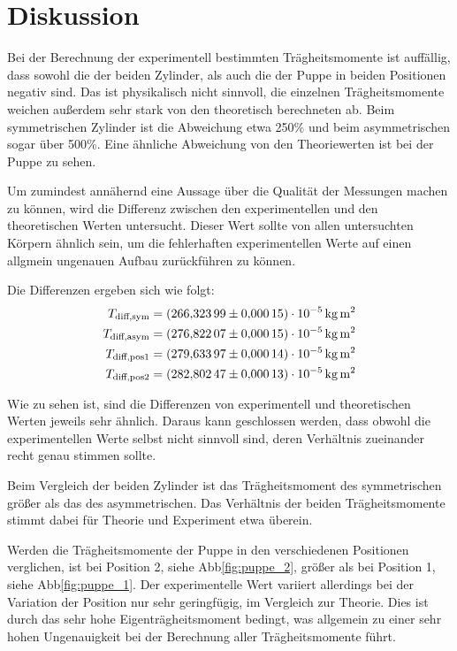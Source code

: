 \section{Diskussion}
\label{sec:Diskussion}



Bei der Berechnung der experimentell bestimmten Trägheitsmomente ist auffällig, dass sowohl die der beiden Zylinder, als auch die 
der Puppe in beiden Positionen negativ sind. Das ist physikalisch nicht sinnvoll, die einzelnen 
Trägheitsmomente weichen außerdem sehr stark von den theoretisch berechneten ab. Beim symmetrischen Zylinder ist die Abweichung etwa
250\% und beim asymmetrischen sogar über 500\%. Eine ähnliche Abweichung von den Theoriewerten ist bei der Puppe zu sehen.

Um zumindest annähernd eine Aussage über die Qualität der Messungen machen zu können, wird die Differenz zwischen den experimentellen 
und den theoretischen Werten untersucht.
Dieser Wert sollte von allen untersuchten Körpern ähnlich sein, um 
die fehlerhaften experimentellen Werte auf einen allgmein ungenauen Aufbau zurückführen zu können.

Die Differenzen ergeben sich wie folgt:
\begin{align}
T_\text{diff,sym}& = \SI{266.32399 (00015)e-5}{\kilo\gram\square\m} \\
T_\text{diff,asym}& = \SI{276.82207 (00015)e-5}{\kilo\gram\square\m} \\
T_\text{diff,pos1}& = \SI{279.63397 (00014)e-5}{\kilo\gram\square\m} \\
T_\text{diff,pos2}& = \SI{282.80247 (00013)e-5}{\kilo\gram\square\m}
\end{align}

Wie zu sehen ist, sind die Differenzen von experimentell und theoretischen Werten jeweils sehr ähnlich.
Daraus kann geschlossen werden, dass obwohl die experimentellen Werte selbst nicht sinnvoll sind, deren Verhältnis zueinander recht 
genau stimmen sollte. 

Beim Vergleich der beiden Zylinder ist das Trägheitsmoment des symmetrischen größer als das des asymmetrischen. Das Verhältnis der
beiden Trägheitsmomente stimmt dabei für Theorie und Experiment etwa überein. 

Werden die Trägheitsmomente der Puppe in den verschiedenen Positionen verglichen, ist bei Position 2, siehe Abb\ref{fig:puppe_2}, 
größer als bei Position 1, siehe Abb\ref{fig:puppe_1}. Der experimentelle Wert variiert allerdings bei der Variation der Position nur 
sehr geringfügig, im Vergleich zur Theorie. Dies ist durch das sehr hohe Eigenträgheitsmoment bedingt, was allgemein zu einer sehr hohen
Ungenauigkeit bei der Berechnung aller Trägheitsmomente führt. 

